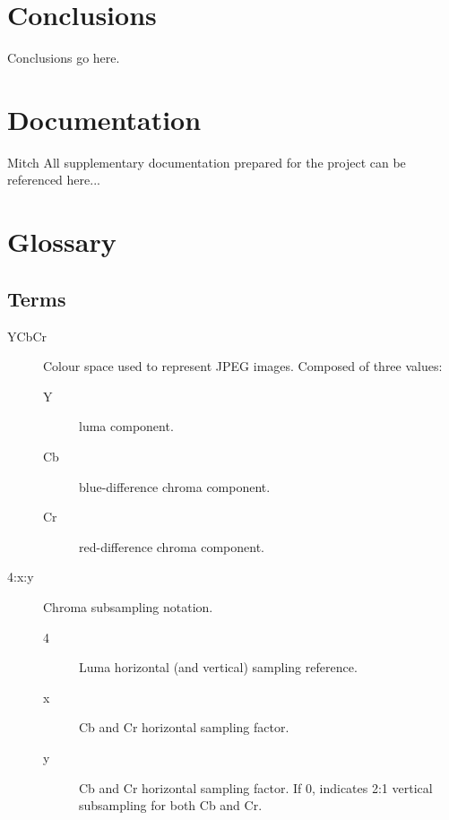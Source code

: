\documentclass[oneside]{ecsgdp}         %
\begin{document}
\chapter{Conclusions}
Conclusions go here.

\chapter{Documentation}
Mitch
All supplementary documentation prepared for the project can be referenced here...




\appendix
\backmatter
\chapter{Glossary}

\section*{Terms} 
\begin{description}
	\item[YCbCr] Colour space used to represent JPEG images. Composed of three values:
		\begin{description}
			\item[Y] luma component.
			\item[Cb] blue-difference chroma component.
			\item[Cr] red-difference chroma component.
		\end{description}
	\item[4:x:y]Chroma subsampling notation.
		\begin{description}
			\item[4] Luma horizontal (and vertical) sampling reference.
			\item[x] Cb and Cr horizontal sampling factor.
			\item[y] Cb and Cr horizontal sampling factor. If 0, indicates 2:1 vertical subsampling for both Cb and Cr.
		\end{description}
\end{description}
\end{document}
